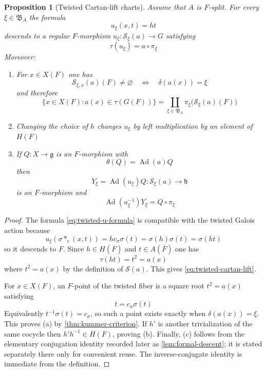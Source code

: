 \documentclass[11pt]{amsart}
\newtheorem{proposition}[proposition]{Proposition}
\theoremstyle{definition}
\theoremstyle{remark}
\newcommand{\Fb}{\overline F}
\newcommand{\cS}{\mathcal S}
\newcommand{\Ad}{\operatorname{Ad}}
\newcommand{\g}{\mathfrak g}
\newcommand{\h}{\mathfrak h}
\begin{document}
\begin{proposition}[Twisted Cartan-lift charts]\label{prop:twisted-cartan-charts}
Assume that $A$ is $F$-split.  For every $\xi\in\mathfrak B_A$ the formula
\begin{equation}\label{eq:twisted-u-formula}
 u_\xi(x,t)=ht
\end{equation}
descends to a regular $F$-morphism $u_\xi:\cS_\xi(a)\to G$ satisfying
\begin{equation}\label{eq:twisted-cartan-lift}
 \tau(u_\xi)=a\circ\pi_\xi
\end{equation}
Moreover:
\begin{enumerate}[label=\textup{(\alph*)},leftmargin=2.3em]
\item For $x\in X(F)$ one has
      \begin{equation}\label{eq:twisted-fiber-kummer}
       \cS_{\xi,x}(a)(F)\ne\varnothing
       \quad\Longleftrightarrow\quad
       \delta(a(x))=\xi
\end{equation}
      and therefore
      \begin{equation}\label{eq:liftable-locus-decomposition}
       \{x\in X(F):a(x)\in\tau(G(F))\}
       =\coprod_{\xi\in\mathfrak B_A}
          \pi_\xi\bigl(\cS_\xi(a)(F)\bigr)
\end{equation}
\item Changing the choice of $h$ changes $u_\xi$ by left multiplication by an
      element of $H(F)$
\item If $Q:X\to\g$ is an $F$-morphism with
      \[
       \theta(Q)=\Ad(a)Q
\]
      then
      \begin{equation}\label{eq:twisted-Y}
       Y_\xi=\Ad(u_\xi)Q:\cS_\xi(a)\longrightarrow\h
\end{equation}
      is an $F$-morphism and
      \begin{equation}\label{eq:twisted-inverse-conjugate}
       \Ad(u_\xi^{-1})Y_\xi=Q\circ\pi_\xi
\end{equation}
\end{enumerate}
\end{proposition}

\begin{proof}
The formula \eqref{eq:twisted-u-formula} is compatible with the twisted
Galois action because
\[
 u_\xi(\sigma *_c(x,t))
 =h c_\sigma\sigma(t)
 =\sigma(h)\sigma(t)
 =\sigma(ht)
\]
so it descends to $F$.  Since $h\in H(\Fb)$ and $t\in A(\Fb)$ one has
\[
 \tau(ht)=t^2=a(x)
\]
where $t^2=a(x)$ by the definition of $\cS(a)$.  This gives
\eqref{eq:twisted-cartan-lift}.

For $x\in X(F)$, an $F$-point of the twisted fiber is a square root
$t^2=a(x)$ satisfying
\[
 t=c_\sigma\sigma(t)
\]
Equivalently $t^{-1}\sigma(t)=c_\sigma$, so such a point exists exactly when
$\delta(a(x))=\xi$.  This proves \textup{(a)} by
\cref{thm:kummer-criterion}.  If $h'$ is another trivialization of the same
cocycle then $h'h^{-1}\in H(F)$, proving \textup{(b)}.  Finally, \textup{(c)} follows from the elementary conjugation identity
recorded later as \cref{lem:formal-descent}; it is stated separately there only
for convenient reuse.  The inverse-conjugate identity is immediate from the
definition.
\end{proof}
\end{document}
